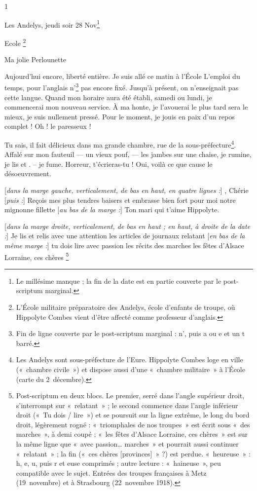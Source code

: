 \begin{LJlettre}
 1\par\nopagebreak[4]

Les Andelys, jeudi soir 28 Nov\footnote{Le millésime manque ; la fin de la date est en partie couverte par le post-scriptum marginal.}

Ecole \footnote{L'École militaire préparatoire des Andelys, école d'enfants de troupe, où Hippolyte Combes vient d'être affecté comme professeur d'anglais.}

Ma jolie Perlounette\label{annexe:doc5-perlounette}

Aujourd'hui encore, liberté entière. Je suis allé ce matin à l'École L'emploi du temps, pour l'anglais n'\footnote{Fin de ligne couverte par le post-scriptum marginal : n', puis a ou e et un t barré.} pas encore fixé. Jusqu'à présent, on n'enseignait pas cette langue. Quand mon horaire aura été établi, samedi ou lundi, je commencerai mon nouveau service. À ma honte, je l'avouerai le plus tard sera le mieux, je suis nullement pressé. Pour le moment, je jouis en paix d'un repos complet ! Oh ! le paresseux !

Tu sais, il fait délicieux dans ma grande chambre, rue de la sous-préfecture\footnote{Les Andelys sont sous-préfecture de l'Eure. Hippolyte Combes loge en ville («~chambre civile~») et dispose aussi d'une «~chambre militaire~» à l'École (carte du 2~décembre).}. Affalé sur mon fauteuil --- un vieux pouf, --- les jambes sur une chaise, je rumine, je lis et . -- je fume. Horreur, t'écrieras-tu ! Oui, voilà ce que cause le désoeuvrement.

[\textit{dans la marge gauche, verticalement, de bas en haut, en quatre lignes :}] , Chérie [\textit{puis :}] Reçois mes plus tendres baisers et embrasse bien fort pour moi notre mignonne fillette [\textit{au bas de la marge :}] Ton mari qui t'aime Hippolyte.

[\textit{dans la marge droite, verticalement, de bas en haut ; en haut, à droite de la date :}] Je lis et relis avec une attention  les articles de journaux relatant [\textit{en bas de la même marge :}] tu dois lire avec passion les récits des marches  \LJlac{} les fêtes d'Alsace Lorraine, ces chères \LJlac{}\footnote{Post-scriptum en deux blocs. Le premier, serré dans l'angle supérieur droit, s'interrompt sur «~relatant~» ; le second commence dans l'angle inférieur droit («~Tu dois / lire~») et se poursuit sur la ligne extrême, le long du bord droit, légèrement rogné : «~triomphales de nos troupes~» est écrit sous «~des marches~», à demi coupé ; «~les fêtes d'Alsace Lorraine, ces chères~» est sur la même ligne que «~avec passion… marches~» et pourrait aussi continuer «~relatant~» ; la fin («~ces chères [provinces]~» ?) est perdue. «~heureuse~» : h, e, u, puis r et euse comprimés ; autre lecture : «~haineuse~», peu compatible avec le sujet. Entrées des troupes françaises à Metz (19~novembre) et à Strasbourg (22~novembre 1918).}


\end{LJlettre}

